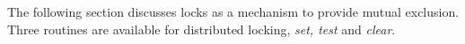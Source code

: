 The following section discusses \openshmem locks as a mechanism to provide mutual exclusion. Three routines are available for distributed locking, 
\textit{set, test} and \textit{clear}.
